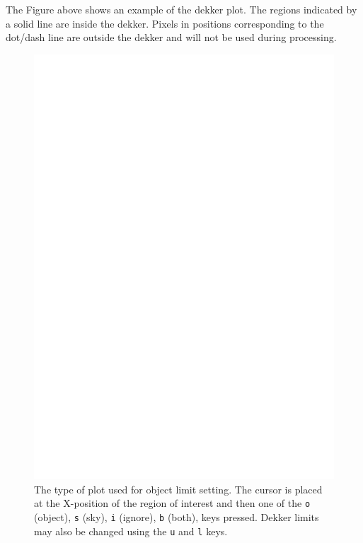 \documentclass[11pt,twoside]{article}
\newcommand{\sunspec}[2]{#1}
\renewcommand{\sunspec}[2]{#2}
\begin{document}
\sunspec{Figure~\ref{fi_dekker}}{The Figure above}
shows an example of the dekker plot. The regions
indicated by a solid line are inside the dekker. Pixels in positions
corresponding to the dot/dash line are outside the dekker and will not
be used during processing.

\begin{figure}
\begin{center}
\includegraphics[width=\textwidth]{sun152_05.eps}

\parbox{140mm}{
\caption{The type of plot used for object limit setting. The cursor is
placed at the X-position of the region of interest and then one of
the {\tt o} (object), {\tt s} (sky), {\tt i} (ignore), {\tt b}
(both), keys pressed. Dekker limits may also be changed using the
{\tt u} and {\tt l} keys.}
\label{fi_objlim}
}
\end{center}
\end{figure}
\end{document}
